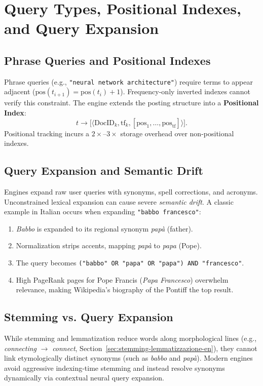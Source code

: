 \FloatBarrier
\section[Query Types and Query Expansion]{Query Types, Positional Indexes, and Query Expansion}
\label{sec:query-expansion-positional-en}

\subsection{Phrase Queries and Positional Indexes}
Phrase queries (e.g., \texttt{"neural network architecture"}) require terms to appear adjacent ($\text{pos}(t_{i+1}) = \text{pos}(t_i) + 1$). Frequency-only inverted indexes cannot verify this constraint. The engine extends the posting structure into a \textbf{Positional Index}:
\begin{equation}
t \longrightarrow \big[ \langle \text{DocID}_k, \text{tf}_k, [\text{pos}_1, \dots, \text{pos}_{\text{tf}}] \rangle \big].
\end{equation}
Positional tracking incurs a $2\times\text{--}3\times$ storage overhead over non-positional indexes.

\subsection{Query Expansion and Semantic Drift}
Engines expand raw user queries with synonyms, spell corrections, and acronyms. Unconstrained lexical expansion can cause severe \textit{semantic drift}. A classic example in Italian occurs when expanding \texttt{"babbo francesco"}:
\begin{enumerate}
    \item \textit{Babbo} is expanded to its regional synonym \textit{pap\`a} (father).
    \item Normalization strips accents, mapping \textit{pap\`a} to \textit{papa} (Pope).
    \item The query becomes \texttt{("babbo" OR "pap\textasciigrave a" OR "papa") AND "francesco"}.
    \item High PageRank pages for Pope Francis (\textit{Papa Francesco}) overwhelm relevance, making Wikipedia's biography of the Pontiff the top result.
\end{enumerate}

\subsection{Stemming vs. Query Expansion}
While stemming and lemmatization reduce words along morphological lines (e.g., \textit{connecting} $\to$ \textit{connect}, Section~\ref{sec:stemming-lemmatizzazione-en}), they cannot link etymologically distinct synonyms (such as \textit{babbo} and \textit{pap\`a}). Modern engines avoid aggressive indexing-time stemming and instead resolve synonyms dynamically via contextual neural query expansion.

